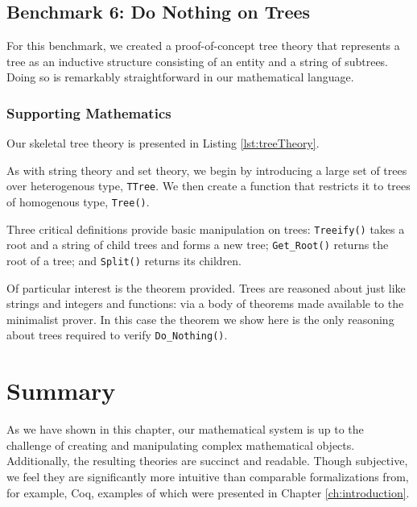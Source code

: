	\subsection{Benchmark 6: Do Nothing on Trees}	
For this benchmark, we created a proof-of-concept tree theory that represents a tree as an inductive structure consisting of an entity and a string of subtrees.  Doing so is remarkably straightforward in our mathematical language.

		\subsubsection{Supporting Mathematics}	

Our skeletal tree theory is presented in Listing \ref{lst:treeTheory}.



As with string theory and set theory, we begin by introducing a large set of trees over heterogenous type, \texttt{TTree}.  We then create a function that restricts it to trees of homogenous type, \texttt{Tree()}.

Three critical definitions provide basic manipulation on trees: \texttt{Treeify()} takes a root and a string of child trees and forms a new tree; \texttt{Get\_Root()} returns the root of a tree; and \texttt{Split()} returns its children.

Of particular interest is the theorem provided.  Trees are reasoned about just like strings and integers and functions: via a body of theorems made available to the minimalist prover.  In this case the theorem we show here is the only reasoning about trees required to verify \texttt{Do\_Nothing()}.

\section{Summary}
As we have shown in this chapter, our mathematical system is up to the challenge of creating and manipulating complex mathematical objects.  Additionally, the resulting theories are succinct and readable.  Though subjective, we feel they are significantly more intuitive than comparable formalizations from, for example, Coq, examples of which were presented in Chapter \ref{ch:introduction}.

